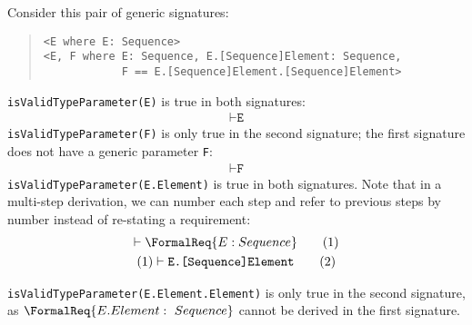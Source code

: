 \documentclass[../generics]{subfiles}
\begin{document}
\begin{example}
Consider this pair of generic signatures:
\begin{quote}
\begin{verbatim}
<E where E: Sequence>
<E, F where E: Sequence, E.[Sequence]Element: Sequence,
            F == E.[Sequence]Element.[Sequence]Element>
\end{verbatim}
\end{quote}
\texttt{isValidTypeParameter(E)} is true in both signatures:
\begin{gather*}
\vdash \texttt{E}
\end{gather*}
\texttt{isValidTypeParameter(F)} is only true in the second signature; the first signature does not have a generic parameter \texttt{F}:
\begin{gather*}
\vdash \texttt{F}
\end{gather*}
\texttt{isValidTypeParameter(E.Element)} is true in both signatures. Note that in a multi-step derivation, we can number each step and refer to previous steps by number instead of re-stating a requirement:
\begin{gather}
\vdash \FormalReq{E: Sequence}\tag{1}\\
(1) \vdash \texttt{E.[Sequence]Element}\tag{2}
\end{gather}
\item \texttt{isValidTypeParameter(E.Element.Element)} is only true in the second signature, as $\FormalReq{E.Element:~Sequence}$ cannot be derived in the first signature.
\end{example}
\end{document}
